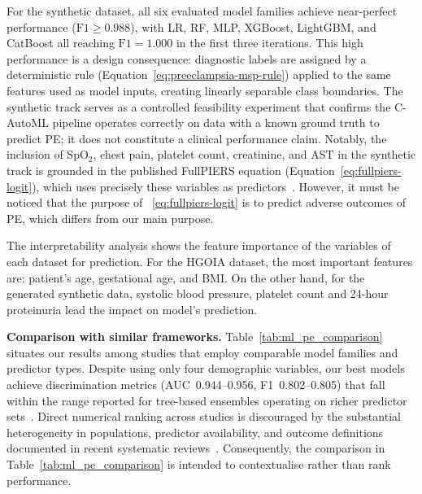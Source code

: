 \documentclass[diagnostics,article,submit,pdftex,moreauthors]{Definitions/mdpi}
\begin{document}
For the synthetic dataset, all six evaluated model
  families achieve near-perfect performance ($\mathrm{F1}\geq 0.988$),
  with \ac{LR}, \ac{RF}, \ac{MLP}, XGBoost, LightGBM, and CatBoost all
  reaching $\mathrm{F1}=1.000$ in the first three iterations. This
  high performance is a design consequence: diagnostic labels are
  assigned by a deterministic rule
  (Equation~\eqref{eq:preeclampsia-msp-rule}) applied to the same
  features used as model inputs, creating linearly separable class
  boundaries. The synthetic track serves as a controlled feasibility
  experiment that confirms the \ac{C-AutoML} pipeline operates
  correctly on data with a known ground truth to predict \ac{PE}; it
  does not constitute a clinical performance claim. Notably, the
  inclusion of SpO$_2$, chest pain, platelet count, creatinine, and
  \ac{AST} in the synthetic track is grounded in the published
  FullPIERS equation (Equation~\eqref{eq:fullpiers-logit}), which uses
  precisely these variables as
  predictors~\cite{fullpiers_2011}. However, it must be noticed that
  the purpose of ~\eqref{eq:fullpiers-logit} is to predict adverse
  outcomes of \ac{PE}, which differs from our main purpose.

The interpretability analysis shows the feature importance of
the variables of each dataset for prediction. For the \ac{HGOIA} dataset, the most important features are: patient's age,
gestational age, and \ac{BMI}. On the other hand, for the generated
synthetic data, systolic blood pressure, platelet count and 24-hour
proteinuria lead the impact on model's prediction.

\textbf{Comparison with similar frameworks.}
  Table~\ref{tab:ml_pe_comparison} situates our results among studies
  that employ comparable model families and predictor types.  Despite
  using only four demographic variables, our best models achieve
  discrimination metrics (AUC~0.944--0.956, F1~0.802--0.805) that fall
  within the range reported for tree-based ensembles operating on
  richer predictor
  sets~\cite{LI2021102,liu_pregnancy_trajectories_2022,zeng_preeclampsia_ml_china_2024,advancing_ml_preeclampsia_2025}.
  Direct numerical ranking across studies is discouraged by the
  substantial heterogeneity in populations, predictor availability,
  and outcome definitions documented in recent systematic
  reviews~\cite{Darsareh2024,Rahman2023,jmijr_ml_pe_review_2026}. Consequently,
  the comparison in Table~\ref{tab:ml_pe_comparison} is intended to
  contextualise rather than rank performance.
\end{document}
